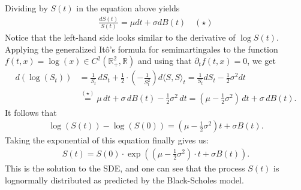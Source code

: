 \documentclass[11pt,a4paper, final]{article}
\begin{document}
Dividing by $S(t)$ in the equation above yields
\begin{align*}\frac{dS(t)}{S(t)}=\mu dt + \sigma dB(t)\quad (\star) \end{align*}
Notice that the left-hand side looks similar to the derivative of $\log{S(t)}$.\\
Applying the generalized Itô's formula for semimartingales to the function $f(t,x)=\log(x)\in C^2(\mathbb{R}_+^2,\mathbb{R})$ and using that $\partial_t f(t,x)=0$, we get 
\begin{align*}
d(\log(S_t))&=\frac{1}{S_t} \, dS_t + \frac{1}{2}\cdot \left(-\frac{1}{S^2_t} \right) d\langle S,S\rangle_t 
= \frac{1}{S_t} dS_t -\frac{1}{2} \sigma^2 dt \\
&\stackrel{(\star)}{=} \mu \, dt + \sigma \, dB(t) -\frac{1}{2} \sigma^2 \, dt
=\left(\mu -\frac{1}{2} \sigma^2\right)\, dt + \sigma \, dB(t).
\end{align*}
It follows that
\begin{align*}\log(S(t))-\log(S(0)) =\left(\mu -\frac{1}{2} \sigma^2\right)t + \sigma B(t).
\end{align*}
Taking the exponential of this equation finally gives us:
\begin{align*}
S(t)=S(0) \cdot \exp\left( \left(\mu - \frac{1}{2}\sigma^2\right)\cdot t + \sigma B(t)\right).
\end{align*}
This is the solution to the SDE, and one can see that the process $S(t)$ is lognormally distributed as predicted by the Black-Scholes model.

\newpage
\end{document}
